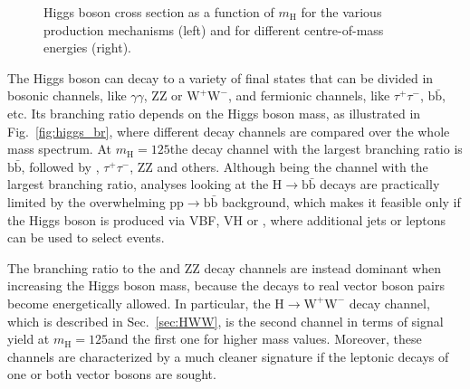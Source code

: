 \begin{figure}[htb]
\centering
{}
\caption{Higgs boson cross section as a function of $m_\mathrm{H}$ for the various production mechanisms (left) and for different centre-of-mass energies (right).}\label{fig:higgs_xsec}
\end{figure}

The Higgs boson can decay to a variety of final states that can be divided in bosonic channels, like $\gamma\gamma$, ZZ or $\mathrm{W^+W^-}$, and fermionic channels, like $\tau^+ \tau^-$, $\mathrm{b\bar b}$, etc.
Its branching ratio depends on the Higgs boson mass, as illustrated in Fig.~\ref{fig:higgs_br}, where different decay channels are compared over the whole mass spectrum. At $m_\mathrm{H} = 125$\GeV the decay channel with the largest branching ratio is $\mathrm{b\bar b}$, followed by \WW, $\tau^+\tau^-$, ZZ and others. Although being the channel with the largest branching ratio, analyses looking at the H$\to \mathrm{b \bar b}$ decays are practically limited by the overwhelming $\mathrm{pp \to b\bar b}$ background, which makes it feasible only if the Higgs boson is produced via VBF, VH or \ttH, where additional jets or leptons can be used to select events.

The branching ratio to the \WW and ZZ decay channels are instead dominant when increasing the Higgs boson mass, because the decays to real vector boson pairs become energetically allowed. In particular, the H$\to \mathrm{W^+W^-}$ decay channel, which is described in Sec.~\ref{sec:HWW}, is the second channel in terms of signal yield at $m_\mathrm{H} = 125$\GeV and the first one for higher mass values. Moreover, these channels are characterized by a much cleaner signature if the leptonic decays of one or both vector bosons are sought.

